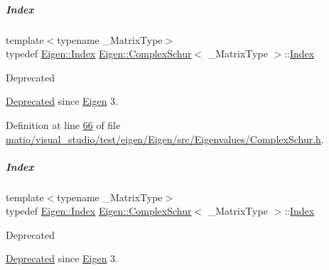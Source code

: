 \mbox{\label{group___eigenvalues___module_a652104d13723a5b1db2937866a034557}} 
\subparagraph{\texorpdfstring{Index}{Index}\hspace{0.1cm}{\footnotesize\ttfamily [1/2]}}
{\footnotesize\ttfamily template$<$typename \+\_\+\+Matrix\+Type$>$ \\
typedef \hyperlink{namespace_eigen_a62e77e0933482dafde8fe197d9a2cfde}{Eigen\+::\+Index} \hyperlink{group___eigenvalues___module_class_eigen_1_1_complex_schur}{Eigen\+::\+Complex\+Schur}$<$ \+\_\+\+Matrix\+Type $>$\+::\hyperlink{group___eigenvalues___module_a652104d13723a5b1db2937866a034557}{Index}}

\begin{DoxyRefDesc}{Deprecated}
\item[\hyperlink{deprecated__deprecated000061}{Deprecated}]since \hyperlink{namespace_eigen}{Eigen} 3. \end{DoxyRefDesc}


Definition at line \hyperlink{matio_2visual__studio_2test_2eigen_2_eigen_2src_2_eigenvalues_2_complex_schur_8h_source_l00066}{66} of file \hyperlink{matio_2visual__studio_2test_2eigen_2_eigen_2src_2_eigenvalues_2_complex_schur_8h_source}{matio/visual\+\_\+studio/test/eigen/\+Eigen/src/\+Eigenvalues/\+Complex\+Schur.\+h}.

\mbox{\label{group___eigenvalues___module_a652104d13723a5b1db2937866a034557}} 
\subparagraph{\texorpdfstring{Index}{Index}\hspace{0.1cm}{\footnotesize\ttfamily [2/2]}}
{\footnotesize\ttfamily template$<$typename \+\_\+\+Matrix\+Type$>$ \\
typedef \hyperlink{namespace_eigen_a62e77e0933482dafde8fe197d9a2cfde}{Eigen\+::\+Index} \hyperlink{group___eigenvalues___module_class_eigen_1_1_complex_schur}{Eigen\+::\+Complex\+Schur}$<$ \+\_\+\+Matrix\+Type $>$\+::\hyperlink{group___eigenvalues___module_a652104d13723a5b1db2937866a034557}{Index}}

\begin{DoxyRefDesc}{Deprecated}
\item[\hyperlink{deprecated__deprecated000017}{Deprecated}]since \hyperlink{namespace_eigen}{Eigen} 3. \end{DoxyRefDesc}


